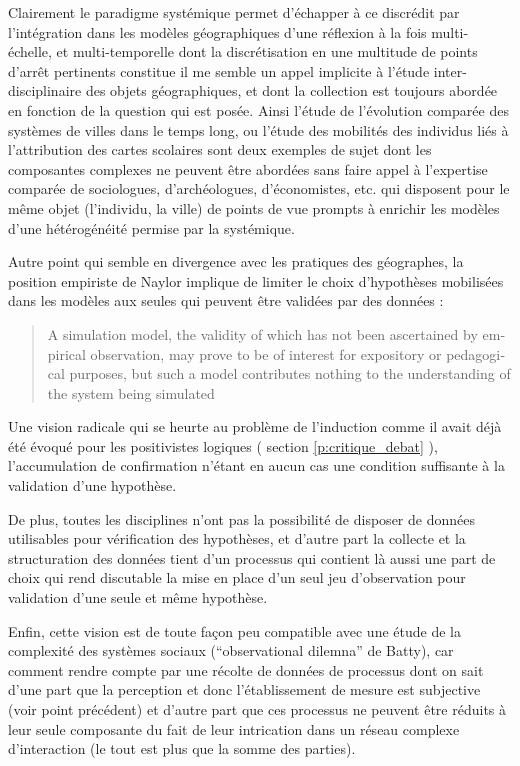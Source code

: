 Clairement le paradigme systémique permet d'échapper à ce discrédit par l'intégration dans les modèles géographiques d'une réflexion à la fois multi-échelle, et multi-temporelle \autocite{Dastes2001a} dont la discrétisation en une multitude de points d’arrêt pertinents constitue il me semble un appel implicite à l'étude inter-disciplinaire des objets géographiques, et dont la collection est toujours abordée en fonction de la question qui est posée. Ainsi l'étude de l'évolution comparée des systèmes de villes dans le temps long, ou l'étude des mobilités des individus liés à l'attribution des cartes scolaires sont deux exemples de sujet dont les composantes complexes ne peuvent être abordées sans faire appel à l'expertise comparée de sociologues, d'archéologues, d'économistes, etc. qui disposent pour le même objet (l'individu, la ville) de points de vue prompts à enrichir les modèles d'une hétérogénéité permise par la systémique.

Autre point qui semble en divergence avec les pratiques des géographes, la position empiriste de Naylor implique de limiter le choix d'hypothèses mobilisées dans les modèles aux seules qui peuvent être validées par des données : \foreignblockquote{english}[\cite{Naylor1967}]{A simulation model, the validity of which has not been ascertained by empirical observation, may prove to be of interest for expository or pedagogical purposes, but such a model contributes nothing to the understanding of the system being simulated}

Une vision radicale qui se heurte au problème de l'induction comme il avait déjà été évoqué pour les positivistes logiques ( section \ref{p:critique_debat} ), l'accumulation de confirmation n'étant en aucun cas une condition suffisante à la validation d'une hypothèse.

De plus, toutes les disciplines n'ont pas la possibilité de disposer de données utilisables pour vérification des hypothèses, et d'autre part la collecte et la structuration des données tient d'un processus qui contient là aussi une part de choix qui rend discutable la mise en place d'un seul jeu d'observation pour validation d'une seule et même hypothèse.

Enfin, cette vision est de toute façon peu compatible avec une étude de la complexité des systèmes sociaux (\foreignquote{english}{observational dilemna} de Batty), car comment rendre compte par une récolte de données de processus dont on sait d'une part que la perception et donc l'établissement de mesure est subjective (voir point précédent) et d'autre part que ces processus ne peuvent être réduits à leur seule composante du fait de leur intrication dans un réseau complexe d'interaction (le tout est plus que la somme des parties).

